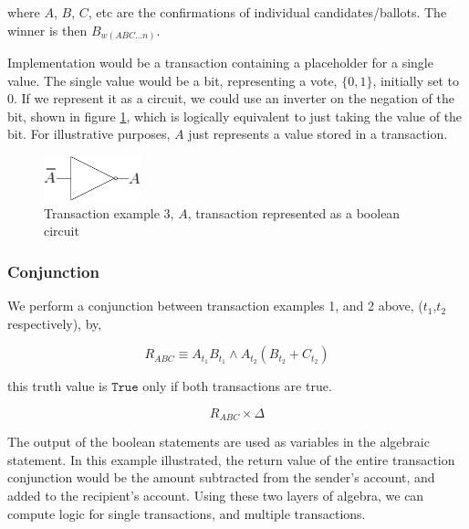 \documentclass[10pt, titlepage, twocolumn]{report}
\begin{document}
where \(A\), \(B\), \(C\), etc are the confirmations of individual candidates/ballots. The winner is then \(B_{w(ABC ... n)}\). 



\hspace*{15pt}
Implementation would be a transaction containing a placeholder for a single value. The single value would be a bit, representing a vote, \(\{0,1\}\), initially set to 0. If we represent it as a circuit, we could use an inverter on the negation of the bit, shown in figure \ref{not}, which is logically equivalent to just taking the value of the bit. For illustrative purposes, \(A\) just represents a value stored in a transaction.


\begin{figure}[ht]
\centering
	\includegraphics[width=0.25\textwidth]{not}
	\caption{Transaction example 3, \(A\),  transaction represented as a boolean circuit}
	\label{not}
\end{figure}



\subsubsection{Conjunction}
\hspace*{15pt}
We perform a conjunction between transaction examples 1, and 2 above, (\(t_1\),\(t_2\) respectively), by,

\begin{equation}
R_{ABC} \equiv A_{t_1}B_{t_1} \land A_{t_2}(B_{t_2}+C_{t_2})
\end{equation}

this truth value is \(\texttt{True}\) only if both transactions are true.

\begin{equation}
R_{ABC} \times \Delta
\end{equation}

\hspace*{15pt}
The output of the boolean statements are used as variables in the algebraic statement. In this example illustrated, the return value of the entire transaction conjunction would be the amount subtracted from the sender's account, and added to the recipient's account. Using these two layers of algebra, we can compute logic for single transactions, and multiple transactions.
\end{document}
